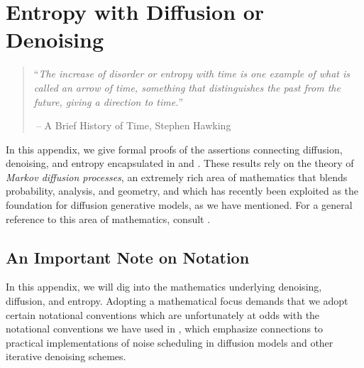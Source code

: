 \documentclass[../../book-main.tex]{subfiles}
\begin{document}
\chapter{Entropy with Diffusion or Denoising}
\label{app:diffusion-denoising}

\begin{quote}
``{\em The increase of disorder or entropy with time is one example of what is called an arrow of time, something that distinguishes the past from the future, giving a direction to time.}''

$~$\hfill -- A Brief History of Time, Stephen Hawking
 \end{quote}
\vspace{5mm}


In this appendix, we give formal proofs of the assertions connecting diffusion,
denoising, and entropy encapsulated in  and
.
These results rely on the theory of \textit{Markov diffusion processes}, an extremely rich area of mathematics that blends probability, analysis, and geometry, and which has recently been exploited as the foundation for diffusion generative models, as we have mentioned.
For a general reference to this area of mathematics, consult \cite{Bakry2016-pl}.

\section{An Important Note on Notation}

In this appendix, we will dig into the mathematics underlying denoising,
diffusion, and entropy. Adopting a mathematical focus demands that we adopt
certain notational conventions which are unfortunately at odds with the
notational conventions we have used in , which emphasize
connections to practical implementations of noise scheduling in diffusion models
and other iterative denoising schemes.
\end{document}
